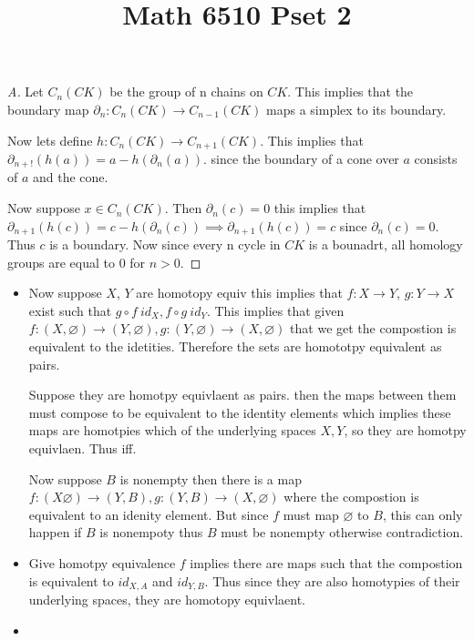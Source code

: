 \documentclass[12pt]{amsart}
\title{Math 6510 Pset 2}
\begin{document}
  \maketitle
  \begin{problem}[Problem 1]
    \begin{proof}[A]
      Let $C_n(CK)$ be the group of n chains on $CK$. This implies that the boundary map $\partial_n: C_n(CK)\to C_{n-1} (CK)$ maps a simplex to its boundary. 
      
      Now lets define $h: C_n(CK)\to C_{n+1}(CK)$. This implies that $\partial_{n+!}(h(a))= a-h(\partial_n(a))$. since the boundary of a cone over $a$ consists of $a$ and the cone. 

      Now suppose $x\in C_n(CK)$. Then $\partial_n(c)=0$ this implies that $\partial_{n+1}(h(c)) = c - h(\partial_n(c)) \implies \partial_{n+1}(h(c))=c$ since $\partial_n(c)=0$. Thus $c$ is a boundary. Now since every n cycle in $CK$ is a bounadrt, all homology groups are equal to $0$ for $n>0$. 
    \end{proof} 
  \end{problem}  
  
  \begin{problem}[Problem 2]
    \begin{itemize}
      \item  Now suppose $X$, $Y$ are homotopy equiv this implies that $f:X\to Y$, $g: Y\to X$ exist such that $g\circ f ~ id_X, f \circ g ~ id_Y$. This implies that given $f: (X,\varnothing)\to (Y,\varnothing), g:(Y, \varnothing)\to (X,\varnothing)$ that we get the compostion is equivalent to the idetities. Therefore the sets are homototpy equivalent as pairs. 

      Suppose they are homotpy equivlaent as pairs. then the maps between them must compose to be equivalent to the identity elements which implies these maps are homotpies which of the underlying spaces $X, Y$, so they are homotpy equivlaen. Thus iff. 

      Now suppose $B$ is nonempty then there is a map $f:(X\varnothing)\to (Y,B), g:(Y,B)\to (X, \varnothing)$ where the compostion is equivalent to an idenity element. But since $f$ must map $\varnothing$ to $B$, this can only happen if $B$ is nonempoty thus $B$ must be nonempty otherwise contradiction. 

    \item Give homotpy equivalence $f$ implies there are maps such that the compostion is equivalent to $id_{X,A}$ and $id_{Y, B}$. Thus since they are also homotypies of their underlying spaces, they are homotopy equivlaent. 

    \item 
  \end{itemize} 

  \end{problem}
\end{document}
